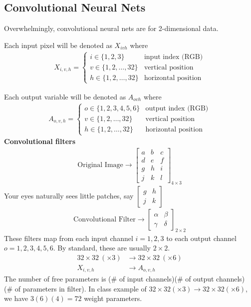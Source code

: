 \documentclass[12pt, letterpaper]{article}
\begin{document}
\subsection{Convolutional Neural Nets}

Overwhelmingly, convolutional neural nets are for 2-dimensional data.

Each input pixel will be denoted as $X_{ivh}$ where 
\begin{align*}
    X_{i,v,h} = \begin{cases}
        i \in \{1,2,3\} & \text{input index (RGB)} \\
        v \in \{1,2,\dots, 32\} & \text{vertical position} \\
        h \in \{1,2,\dots, 32\} & \text{horizontal position}
    \end{cases}
\end{align*}

Each output variable will be denoted as $A_{ovh}$ where
\begin{align*}
    A_{o,v,h} = \begin{cases}
        o \in \{1,2,3,4,5,6\} & \text{output index (RGB)} \\
        v \in \{1,2,\dots, 32\} & \text{vertical position} \\
        h \in \{1,2,\dots, 32\} & \text{horizontal position}
    \end{cases}
\end{align*}
\textbf{Convolutional filters} \\
\begin{align*}
    \text{Original Image} \rightarrow 
    \begin{bmatrix}
        a & b & c \\
        d & e & f \\
        g & h & i \\
        j & k & l
    \end{bmatrix}_{4\times 3}
\end{align*}
Your eyes naturally sees little patches, say $\begin{bmatrix}
    g & h \\ j & k
\end{bmatrix}$ \\
\begin{align*}
    \text{Convolutional Filter} \rightarrow
    \begin{bmatrix}
        \alpha & \beta \\ \gamma & \delta
    \end{bmatrix}_{2\times 2}
\end{align*}
These filters map from each input channel $i = 1,2,3$ to each output channel $o=1,2,3,4,5,6$.
By standard, these are usually $2\times 2$.
\begin{align*}
    32\times 32\ (\times 3) &\rightarrow 32\times 32\ (\times 6) \\
    X_{i,v,h} &\rightarrow A_{o,v,h}
\end{align*}
The number of free parameters is (\# of input channels)(\# of output channels)
(\# of parameters in filter). In class example of $32\times 32 (\times 3) \rightarrow
32\times 32(\times 6)$, we have $3(6)(4) = 72$ weight parameters.
\end{document}
